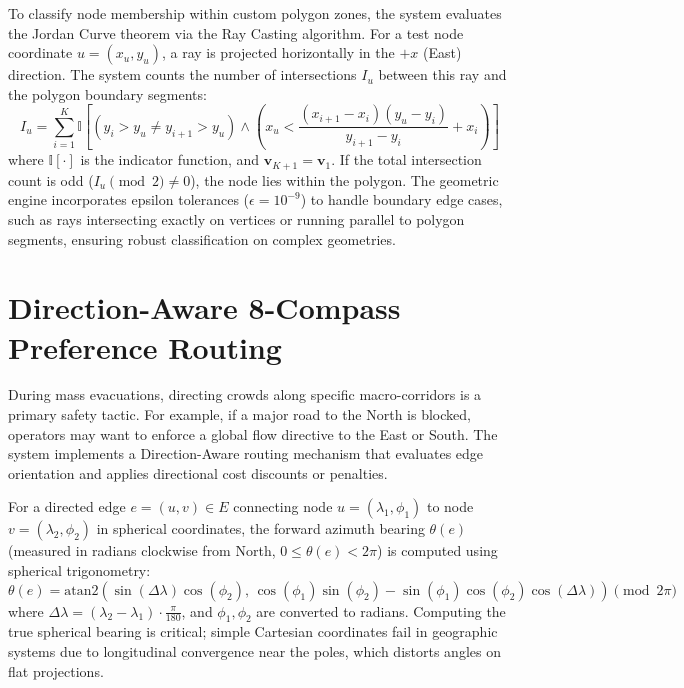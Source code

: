 \documentclass[12pt,a4paper,oneside]{report}
\begin{document}
To classify node membership within custom polygon zones, the system evaluates the Jordan Curve theorem via the Ray Casting algorithm. For a test node coordinate $u = (x_u, y_u)$, a ray is projected horizontally in the $+x$ (East) direction. The system counts the number of intersections $I_u$ between this ray and the polygon boundary segments:
\begin{equation}
I_u = \sum_{i=1}^K \mathbb{I} \left[ \left( y_i > y_u \ne y_{i+1} > y_u \right) \land \left( x_u < \frac{(x_{i+1} - x_i)(y_u - y_i)}{y_{i+1} - y_i} + x_i \right) \right]
\label{eq:ray_casting}
\end{equation}
where $\mathbb{I}[\cdot]$ is the indicator function, and $\mathbf{v}_{K+1} = \mathbf{v}_1$. If the total intersection count is odd ($I_u \pmod 2 \ne 0$), the node lies within the polygon. The geometric engine incorporates epsilon tolerances ($\epsilon = 10^{-9}$) to handle boundary edge cases, such as rays intersecting exactly on vertices or running parallel to polygon segments, ensuring robust classification on complex geometries.

\section{Direction-Aware 8-Compass Preference Routing}
During mass evacuations, directing crowds along specific macro-corridors is a primary safety tactic. For example, if a major road to the North is blocked, operators may want to enforce a global flow directive to the East or South. The system implements a Direction-Aware routing mechanism that evaluates edge orientation and applies directional cost discounts or penalties.

For a directed edge $e = (u, v) \in E$ connecting node $u = (\lambda_1, \phi_1)$ to node $v = (\lambda_2, \phi_2)$ in spherical coordinates, the forward azimuth bearing $\theta(e)$ (measured in radians clockwise from North, $0 \le \theta(e) < 2\pi$) is computed using spherical trigonometry:
\begin{equation}
\theta(e) = \text{atan2} \left( \sin(\Delta \lambda)\cos(\phi_2), \, \cos(\phi_1)\sin(\phi_2) - \sin(\phi_1)\cos(\phi_2)\cos(\Delta \lambda) \right) \pmod{2\pi}
\label{eq:bearing}
\end{equation}
where $\Delta \lambda = (\lambda_2 - \lambda_1) \cdot \frac{\pi}{180}$, and $\phi_1, \phi_2$ are converted to radians. Computing the true spherical bearing is critical; simple Cartesian coordinates fail in geographic systems due to longitudinal convergence near the poles, which distorts angles on flat projections.
\end{document}
